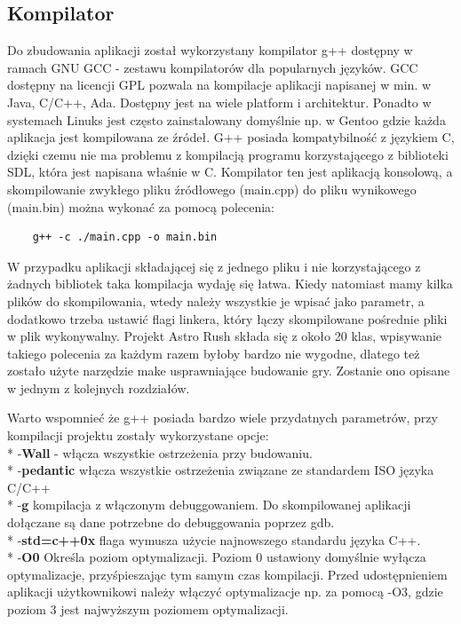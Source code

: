 \subsection{Kompilator}
\hspace{1cm} Do zbudowania aplikacji został wykorzystany kompilator g++ dostępny w ramach GNU GCC - zestawu kompilatorów dla popularnych języków. GCC dostępny na licencji GPL pozwala na kompilacje aplikacji napisanej w min. w Java, C/C++, Ada. Dostępny jest na wiele platform i architektur. Ponadto w systemach Linuks jest często zainstalowany domyślnie np. w Gentoo gdzie każda aplikacja jest kompilowana ze źródeł. G++ posiada kompatybilność z językiem C, dzięki czemu nie ma problemu z kompilacją programu korzystającego z biblioteki SDL, która jest napisana właśnie w C. Kompilator ten jest aplikacją konsolową, a skompilowanie zwykłego pliku źródłowego (main.cpp) do pliku wynikowego (main.bin) można wykonać za pomocą polecenia:
\begin{verbatim}
	g++ -c ./main.cpp -o main.bin
\end{verbatim}

W przypadku aplikacji składającej się z jednego pliku i nie korzystającego z żadnych bibliotek taka kompilacja wydaję się łatwa.
Kiedy natomiast mamy kilka plików do skompilowania, wtedy należy wszystkie je wpisać jako parametr, a dodatkowo trzeba ustawić 
flagi linkera, który łączy skompilowane pośrednie pliki w plik wykonywalny.
Projekt Astro Rush składa się z około 20 klas, wpisywanie takiego polecenia za każdym razem byłoby bardzo nie wygodne, dlatego też zostało użyte narzędzie make usprawniające budowanie gry. Zostanie ono opisane w jednym z kolejnych rozdziałów. 

Warto wspomnieć że g++ posiada bardzo wiele przydatnych parametrów, przy kompilacji projektu zostały wykorzystane opcje: \\*
-\textbf{Wall} - włącza wszystkie ostrzeżenia przy budowaniu. \\*
-\textbf{pedantic} włącza wszystkie ostrzeżenia związane ze standardem ISO języka C/C++ \\*
-\textbf{g} kompilacja z włączonym debuggowaniem. Do skompilowanej aplikacji dołączane są dane potrzebne do debuggowania poprzez gdb. \\*
-\textbf{std=c++0x} flaga wymusza użycie najnowszego standardu języka C++. \\*
-\textbf{O0} Określa poziom optymalizacji. Poziom 0 ustawiony domyślnie wyłącza optymalizacje, przyśpieszając tym samym czas kompilacji. Przed udostępnieniem aplikacji użytkownikowi należy włączyć optymalizacje np. za pomocą -O3, gdzie poziom 3 jest najwyższym poziomem optymalizacji.  

